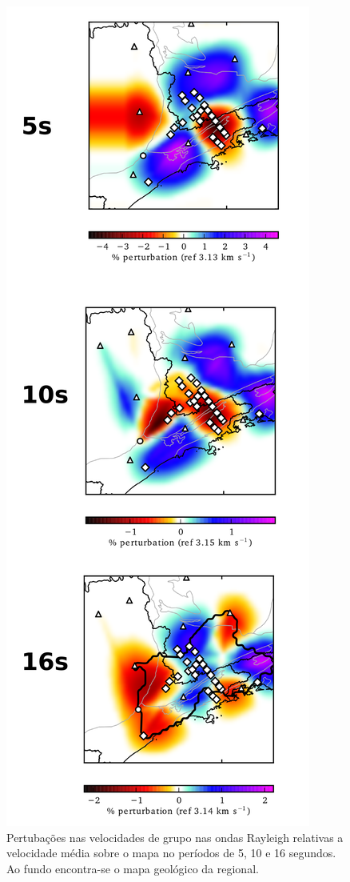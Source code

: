\begin{figure}[!ht]
\centering
\includegraphics[scale=0.25]{Figs/mapa_tomografia.png}
\caption[Mosaico contendo as pertubações nas velocidades de grupo das ondas Rayleigh.]{Pertubações nas velocidades de grupo nas ondas Rayleigh relativas a velocidade média sobre o mapa no períodos de 5, 10 e 16 segundos. Ao fundo encontra-se o mapa geológico da regional.}
\label{tomografia}
\end{figure}

